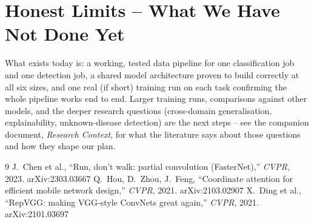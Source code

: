 \documentclass[11pt,a4paper]{article}
\begin{document}
\section{Honest Limits -- What We Have Not Done Yet}
What exists today is: a working, tested data pipeline for one classification job and one
detection job, a shared model architecture proven to build correctly at all six sizes,
and one real (if short) training run on each task confirming the whole pipeline works end
to end. Larger training runs, comparisons against other models, and the deeper research
questions (cross-domain generalisation, explainability, unknown-disease detection) are
the next steps -- see the companion document, \emph{Research Context}, for what the
literature says about those questions and how they shape our plan.

\begin{thebibliography}{9}
\footnotesize
{} J.~Chen et al., ``Run, don't walk: partial convolution (FasterNet),'' \emph{CVPR}, 2023. arXiv:2303.03667
 Q.~Hou, D.~Zhou, J.~Feng, ``Coordinate attention for efficient mobile network design,'' \emph{CVPR}, 2021. arXiv:2103.02907
 X.~Ding et al., ``RepVGG: making VGG-style ConvNets great again,'' \emph{CVPR}, 2021. arXiv:2101.03697
\end{thebibliography}
\end{document}
